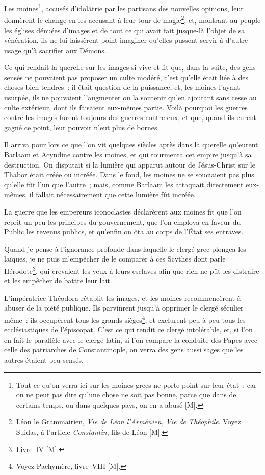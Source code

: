 \documentclass[french,twoside]{book} %
\begin{document}
Les moines\footnote{Tout ce qu’on verra ici sur les moines grecs ne porte point sur leur état ; car on ne peut pas dire qu’une chose ne soit pas bonne, parce que dans de certains temps, ou dans quelques pays, on en a abusé [M].}, accusés d’idolâtrie par les partisans des nouvelles opinions, leur donnèrent le change en les accusant à leur tour de magie\footnote{Léon le Grammairien, {\itshape Vie de Léon l’Arménien, Vie de Théophile}. Voyez Suidas, à l’article {\itshape Constantin}, fils de Léon [M].}, et, montrant au peuple les églises dénuées d’images et de tout ce qui avait fait jusque-là l’objet de sa vénération, ils ne lui laissèrent point imaginer qu’elles pussent servir à d’autre usage qu’à sacrifier aux Démons.\par
Ce qui rendait la querelle sur les images si vive et fit que, dans la suite, des gens sensés ne pouvaient pas proposer un culte modéré, c’est qu’elle était liée à des choses bien tendres : il était question de la puissance, et, les moines l’ayant usurpée, ils ne pouvaient l’augmenter ou la soutenir qu’en ajoutant sans cesse au culte extérieur, dont ils faisaient eux-mêmes partie. Voilà pourquoi les guerres contre les images furent toujours des guerres contre eux, et que, quand ils eurent gagné ce point, leur pouvoir n’eut plus de bornes.\par
Il arriva pour lors ce que l’on vit quelques siècles après dans la querelle qu’eurent Barlaam et Acyndine contre les moines, et qui tourmenta cet empire jusqu’à sa destruction. On disputait si la lumière qui apparut autour de Jésus-Christ sur le Thabor était créée ou incréée. Dans le fond, les moines ne se souciaient pas plus qu’elle fût l’un que l’autre ; mais, comme Barlaam les attaquait directement eux-mêmes, il fallait nécessairement que cette lumière fût incréée.\par
La guerre que les empereurs iconoclastes déclarèrent aux moines fit que l’on reprit un peu les principes du gouvernement, que l’on employa en faveur du Public les revenus publics, et qu’enfin on ôta au corps de l’État ses entraves.\par
Quand je pense à l’ignorance profonde dans laquelle le clergé grec plongea les laïques, je ne puis m’empêcher de le comparer à ces Scythes dont parle Hérodote\footnote{Livre IV [M].}, qui crevaient les yeux à leurs esclaves afin que rien ne pût les distraire et les empêcher de battre leur lait.\par
L’impératrice Théodora rétablit les images, et les moines recommencèrent à abuser de la piété publique. Ils parvinrent jusqu’à opprimer le clergé séculier même : ils occupèrent tous les grands sièges\footnote{Voyez Pachymère, livre VIII [M].}, et exclurent peu à peu tous les ecclésiastiques de l’épiscopat. C’est ce qui rendit ce clergé intolérable, et, si l’on en fait le parallèle avec le clergé latin, si l’on compare la conduite des Papes avec celle des patriarches de Constantinople, on verra des gens aussi sages que les autres étaient peu sensés.\par
\end{document}
